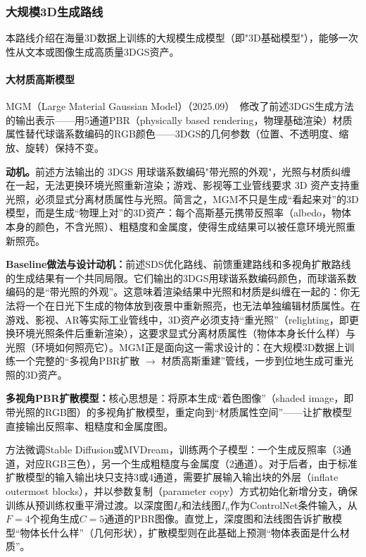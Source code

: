 \subsubsection{大规模3D生成路线}

本路线介绍在海量3D数据上训练的大规模生成模型（即"3D基础模型"），能够一次性从文本或图像生成高质量3DGS资产。

\paragraph{大材质高斯模型}

MGM（Large Material Gaussian Model）（2025.09）~\cite{2509_22112}修改了前述3DGS生成方法的输出表示——用5通道PBR（physically based rendering，物理基础渲染）材质属性替代球谐系数编码的RGB颜色——3DGS的几何参数（位置、不透明度、缩放、旋转）保持不变。

\textbf{动机。}前述方法输出的 3DGS 用球谐系数编码"带光照的外观"，光照与材质纠缠在一起，无法更换环境光照重新渲染；游戏、影视等工业管线要求 3D 资产支持重光照，必须显式分离材质属性与光照。简言之，MGM不只是生成``看起来对''的3D模型，而是生成``物理上对''的3D资产：每个高斯基元携带反照率（albedo，物体本身的颜色，不含光照）、粗糙度和金属度，使得生成结果可以被任意环境光照重新照亮。

\textbf{Baseline做法与设计动机：}前述SDS优化路线、前馈重建路线和多视角扩散路线的生成结果有一个共同局限。它们输出的3DGS用球谐系数编码颜色，而球谐系数编码的是``带光照的外观''。这意味着渲染结果中光照和材质是纠缠在一起的：你无法将一个在日光下生成的物体放到夜景中重新照亮，也无法单独编辑材质属性。在游戏、影视、AR等实际工业管线中，3D资产必须支持``重光照''（relighting，即更换环境光照条件后重新渲染），这要求显式分离材质属性（物体本身长什么样）与光照（环境如何照亮它）。MGM正是面向这一需求设计的：在大规模3D数据上训练一个完整的``多视角PBR扩散 $\to$ 材质高斯重建''管线，一步到位地生成可重光照的3D资产。

\textbf{多视角PBR扩散模型：}核心思想是：将原本生成``着色图像''（shaded image，即带光照的RGB图）的多视角扩散模型，重定向到``材质属性空间''——让扩散模型直接输出反照率、粗糙度和金属度图。

方法微调Stable Diffusion或MVDream，训练两个子模型：一个生成反照率（3通道，对应RGB三色），另一个生成粗糙度与金属度（2通道）。对于后者，由于标准扩散模型的输入输出块只支持3或4通道，需要扩展输入输出块的外层（inflate outermost blocks），并以参数复制（parameter copy）方式初始化新增分支，确保训练从预训练权重平滑过渡。以深度图$I_d$和法线图$I_n$作为ControlNet条件输入，从$F=4$个视角生成$C=5$通道的PBR图像。直觉上，深度图和法线图告诉扩散模型``物体长什么样''（几何形状），扩散模型则在此基础上预测``物体表面是什么材质''。

